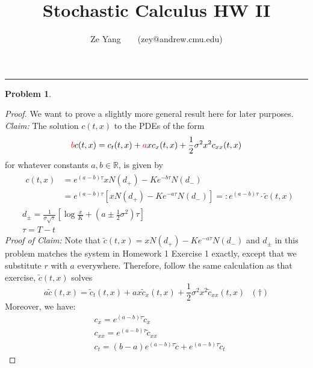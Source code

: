 \documentclass[a4paper, 10pt]{article}
\title{\textbf{Stochastic Calculus HW II}}
\author{Ze Yang~~~~(zey@andrew.cmu.edu)}
\theoremstyle{definition}
\newtheorem{problem}{Problem}
\theoremstyle{hSol}
\begin{document}
\maketitle



\noindent\rule{16cm}{0.4pt}
\begin{problem} 
\end{problem}
\begin{proof} We want to prove a slightly more general result here for later purposes. \\
\textit{Claim:} The solution $c(t,x)$ to the PDEs of the form 
\begin{equation}
  \textcolor{red}{b} c(t,x) = c_t(t,x)  + \textcolor{red}{a}xc_x(t,x)  +\frac{1}{2}\sigma^2 x^2 c_{xx}(t,x)
\end{equation}
for whatever constants $a, b \in \mathbb{R}$, is given by
\begin{equation}
  \begin{split}
  &\begin{split}
    c(t,x) &= e^{(a-b)\tau} xN(d_+)- Ke^{-b\tau}N(d_-)\\
    &=e^{(a-b)\tau} [xN(d_+) - Ke^{-a\tau}N(d_-)]=:e^{(a-b)\tau}\cdot \widetilde{c}(t,x) 
  \end{split}\\
  &d_{\pm} = \frac{1}{\sigma \sqrt{\tau}} \left[\log \frac{x}{K}+ \left(a\pm \frac{1}{2}\sigma^2\right) \tau \right]\\
  &\tau = T-t
\end{split}
\end{equation}
\textit{Proof of Claim:} Note that $\widetilde{c}(t,x)=xN(d_+) - Ke^{-a\tau}N(d_-)$ and $d_{\pm}$ in this problem matches the system in Homework 1 Exercise 1 exactly, except that we substitute $r$ with $a$ everywhere. Therefore, follow the same calculation as that exercise, $\widetilde{c}(t,x)$ solves
\begin{equation}
	a \widetilde{c}(t,x) = \widetilde{c}_t(t,x) + a x \widetilde{c}_x(t,x) + \frac{1}{2}\sigma^2 x^2 \widetilde{c}_{xx}(t,x)~~~(\dag)
\end{equation}
Moreover, we have:
\begin{equation}
	\begin{split}
		&c_x = e^{(a-b)\tau} \widetilde{c}_x \\
		&c_{xx} = e^{(a-b)\tau} \widetilde{c}_{xx} \\
		&c_t = (b-a)e^{(a-b)\tau}\widetilde{c} + e^{(a-b)\tau} \widetilde{c}_t

\end{split}
\end{equation}
\end{proof}
\end{document}

